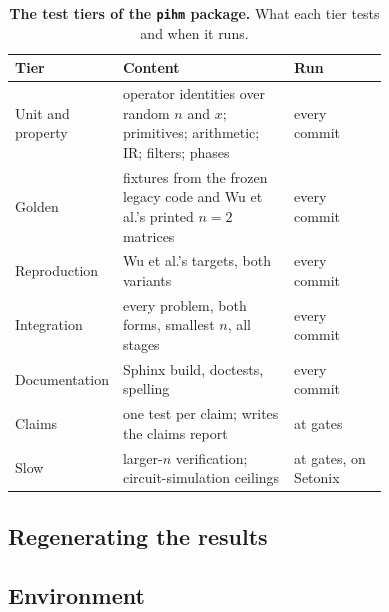 \begin{table}[htbp]
    \centering
    \caption[The test tiers of the \texttt{pihm} package]{\textbf{The test tiers of the \texttt{pihm} package.} What each tier tests and when it runs.}
    \label{tab:test-tiers}
    \small
    \begin{tabular}{@{}l p{0.48\linewidth} p{0.26\linewidth}@{}}
        \toprule
        Tier & Content & Run \\
        \midrule
        Unit and property & operator identities over random $n$ and $x$; primitives; arithmetic; IR; filters; phases & every commit \\
        Golden & fixtures from the frozen legacy code and Wu et al.'s printed $n = 2$ matrices & every commit \\
        Reproduction & Wu et al.'s targets, both variants & every commit \\
        Integration & every problem, both forms, smallest $n$, all stages & every commit \\
        Documentation & Sphinx build, doctests, spelling & every commit \\
        Claims & one test per claim; writes the claims report & at gates \\
        Slow & larger-$n$ verification; circuit-simulation ceilings & at gates, on Setonix \\
        \bottomrule
    \end{tabular}
\end{table}

\subsection{Regenerating the results}
\label{app:software-regenerate}

\subsection{Environment}
\label{app:software-environment}
